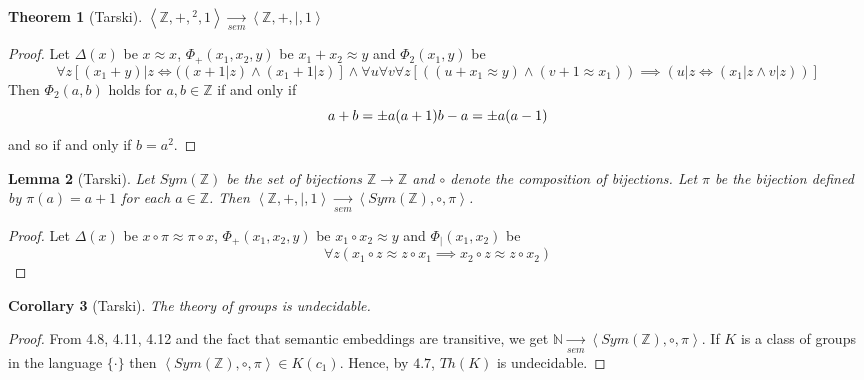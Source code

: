 \documentclass[12pt,a4paper]{article}
\newtheorem{theorem}{Theorem}[section]
\newtheorem{lemma}[theorem]{Lemma}
\newtheorem{corollary}[theorem]{Corollary}
\newcommand\NN{\mathbb{N}}
\newcommand\ZZ{\mathbb{Z}}
\begin{document}
\begin{theorem}[Tarski]
    $\left<\ZZ,+,{}^2,1\right>\xrightarrow[sem]{}\left<\ZZ,+,|,1\right>$
\end{theorem}
\begin{proof}
    Let $\Delta(x)$ be $x\approx x$, $\Phi_+(x_1,x_2,y)$ be $x_1+x_2\approx y$ and $\Phi_2(x_1,y)$ be 
    \[\forall z[(x_1+y)|z\iff((x+1|z)\wedge(x_1+1|z)]\wedge\forall u\forall v \forall z[((u+x_1\approx y)\wedge(v+1\approx x_1))\implies(u|z\iff (x_1|z\wedge v|z))]
    \]
    Then $\Phi_2(a,b)$ holds for $a,b\in\ZZ$ if and only if
    \[
            a+b=\pm a(a+1)\\
            b-a=\pm a(a-1)
    \]
    and so if and only if $b=a^2$.
\end{proof}

\begin{lemma}[Tarski]
    Let $Sym(\ZZ)$ be the set of bijections $\ZZ\to\ZZ$ and $\circ$ denote the composition of bijections. 
    Let $\pi$ be the bijection defined by $\pi(a)=a+1$ for each $a\in\ZZ$. Then $\left<\ZZ,+,|,1\right>\xrightarrow[sem]{}\left<Sym(\ZZ),\circ,\pi\right>$.
\end{lemma}
\begin{proof}
    Let $\Delta(x)$ be $x\circ \pi\approx\pi\circ x$, $\Phi_+(x_1,x_2,y)$ be $x_1\circ x_2\approx y$ and $\Phi_|(x_1,x_2)$ be 
    \[
    \forall z(x_1\circ z\approx z\circ x_1\implies x_2\circ z\approx z\circ x_2)
    \]
\end{proof}

\begin{corollary}[Tarski]
    The theory of groups is undecidable.
\end{corollary}
\begin{proof}
    From 4.8, 4.11, 4.12 and the fact that semantic embeddings are transitive, we get $\NN\xrightarrow[sem]{}\left<Sym(\ZZ),\circ,\pi\right>$.
    If $K$ is a class of groups in the language $\{\cdot\}$ then $\left<Sym(\ZZ),\circ,\pi\right>\in K(c_1)$.
    Hence, by $4.7$, $Th(K)$ is undecidable.
\end{proof}
\end{document}
